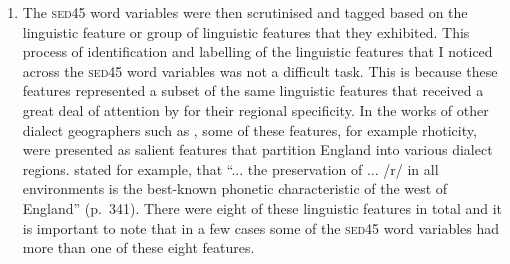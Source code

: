 \begin{enumerate}
\item{The \textsc{sed45} word variables were then scrutinised and tagged based on the linguistic feature or group of linguistic features that they exhibited. This process of identification and labelling of the linguistic features that I noticed across the \textsc{sed45} word variables was not a difficult task. This is because these features represented a subset of the same linguistic features that received a great deal of attention by \citet{Orton6271} for their regional specificity. In the works of other dialect geographers such as \citet{Wells82}, some of these features, for example rhoticity, were presented as salient features that partition England into various dialect regions. \citet{Wells82} stated for example, that ``... the preservation of ... /r/ in all environments is the best-known phonetic characteristic of the west of England'' (p.~341). There were eight of these linguistic features in total and it is important to note that in a few cases some of the \textsc{sed45} word variables had more than one of these eight features.}

\end{enumerate}


